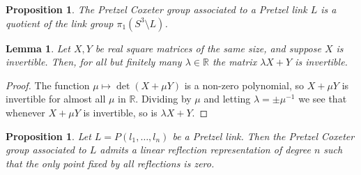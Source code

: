 \documentclass[11pt]{article}
\newtheorem{proposition}[theorem]{Proposition}
\newtheorem{lemma}[theorem]{Lemma}
\begin{document}
\begin{proposition}
The Pretzel Coxeter group associated to a Pretzel link $L$ is a quotient of the link group $\pi_1(S^3 \setminus L)$. 
\end{proposition}


\begin{lemma}\label{lem:arthurs-trick}
Let $X,Y$ be real square matrices of the same size, and suppose $X$ is invertible. Then, for all but finitely many $\lambda \in \mathbb{R}$ the matrix $\lambda X + Y$ is invertible.
\end{lemma}

\begin{proof}
The function $\mu \mapsto \det(X + \mu Y)$ is a non-zero polynomial, so $X + \mu Y$ is invertible for almost all $\mu$ in $\mathbb{R}$. Dividing by $\mu$ and letting $\lambda = \pm \mu^{-1}$ we see that whenever $X + \mu Y$ is invertible, so is $\lambda X + Y$.
\end{proof}

\begin{proposition}
Let $L = P(l_1,\dots, l_n)$ be a Pretzel link. Then the Pretzel Coxeter group associated to $L$ admits a linear reflection representation of degree $n$ such that the only point fixed by all reflections is zero.
\end{proposition}
\end{document}
